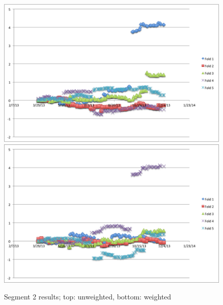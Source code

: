 \documentclass[11pt,letterpaper]{article}
\begin{document}
\begin{itemize}
\begin{figure}
   	\includegraphics[width=14cm]{images/unweighted-exp-1.png}
    	\qquad
    	\includegraphics[width=14cm]{images/weighted-exp-1.png}
    	\caption{Segment 2 results; top: unweighted, bottom: weighted}%
    	\label{fig:2}
\end{figure}


\end{itemize}
\end{document}
